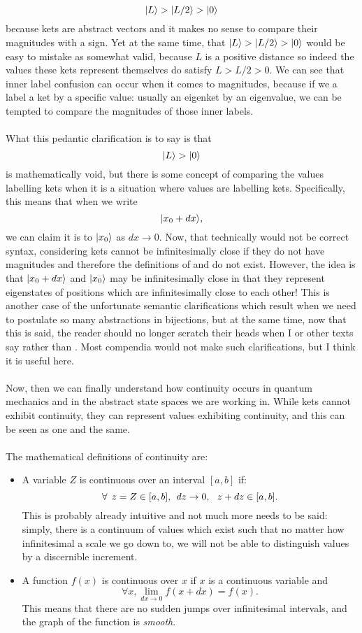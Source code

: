 $$
|L\rangle > |L/2\rangle > |0\rangle
$$
because kets are abstract vectors and it makes no sense to compare their magnitudes with a  sign. Yet at the same time, that $|L\rangle>|L/2\rangle>|0\rangle$ would be easy to mistake as somewhat valid, because $L$ is a positive distance so indeed the values these kets represent themselves do satisfy $L>L/2>0$. We can see that inner label confusion can occur when it comes to magnitudes, because if we a label a ket by a specific value: usually an eigenket by an eigenvalue, we can be tempted to compare the magnitudes of those inner labels.
\\\\
What this pedantic clarification is to say is that
$$
|L\rangle > |0\rangle
$$
is mathematically void, but there is some concept of comparing the values labelling kets when it is a situation where values are labelling kets. Specifically, this means that when we write 
$$
|x_{0}+dx\rangle,
$$
we can claim it is  to $|x_{0}\rangle$ as $dx\to0$. Now, that technically would not be correct syntax, considering kets cannot be infinitesimally close if they do not have magnitudes and therefore the definitions of  and  do not exist. However, the idea is that $|x_{0}+dx\rangle$ and $|x_{0}\rangle$ may be infinitesimally close in that they represent eigenstates of positions which are infinitesimally close to each other! This is another case of the unfortunate semantic clarifications which result when we need to postulate so many abstractions in bijections, but at the same time, now that this is said, the reader should no longer scratch their heads when I or other texts say  rather than . Most compendia would not make such clarifications, but I think it is useful here.
\\\\
Now, then we can finally understand how continuity occurs in quantum mechanics and in the abstract state spaces we are working in. While kets cannot exhibit continuity, they can represent values exhibiting continuity, and this can be seen as one and the same.
\\\\
The mathematical definitions of continuity are:
\begin{itemize}
    \item A variable $Z$ is continuous over an interval $[a,b]$ if:
    $$
    \forall\:\: z=Z\in[a,b], \:\: dz\to 0, \:\:\: z+dz\in[a,b].
    $$
    This is probably already intuitive and not much more needs to be said: simply, there is a continuum of values which exist such that no matter how infinitesimal a scale we go down to, we will not be able to distinguish values by a discernible increment. 
    \item A function $f(x)$ is continuous over $x$ if $x$ is a continuous variable and
    $$
    \forall x, \lim_{dx\to 0}f(x+dx)=f(x).
    $$
    This means that there are no sudden jumps over infinitesimal intervals, and the graph of the function is \textit{smooth}.
\end{itemize}
